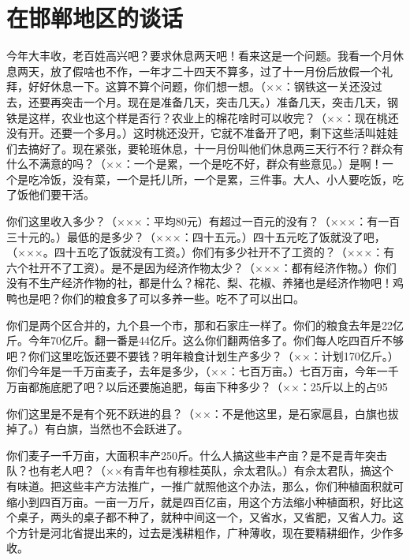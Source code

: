 \section[在邯郸地区的谈话（一九五八年十一月一日）]{在邯郸地区的谈话}


今年大丰收，老百姓高兴吧？要求休息两天吧！看来这是一个问题。我看一个月休息两天，放了假啥也不作，一年才二十四天不算多，过了十一月份后放假一个礼拜，好好休息一下。这算不算个问题，你们想一想。（××：钢铁这一关还没过去，还要再突击一个月。现在是准备几天，突击几天。）准备几天，突击几天，钢铁是这样，农业也这个样是否行？农业上的棉花啥时可以收完？（××：现在桃还没有开。还要一个多月。）这时桃还没开，它就不准备开了吧，剩下这些活叫娃娃们去搞好了。现在紧张，要轮班休息，十一月份叫他们休息两三天行不行？群众有什么不满意的吗？（××：一个是累，一个是吃不好，群众有些意见。）是啊！一个是吃冷饭，没有菜，一个是托儿所，一个是累，三件事。大人、小人要吃饭，吃了饭他们要干活。

你们这里收入多少？（×××：平均80元）有超过一百元的没有？（×××：有一百三十元的。）最低的是多少？（×××：四十五元。）四十五元吃了饭就没了吧，（×××。四十五吃了饭就没有工资。）你们有多少社开不了工资的？（×××：有六个社开不了工资）。是不是因为经济作物太少？（×××：都有经济作物。）你们没有不生产经济作物的社，都是什么？棉花、梨、花椒、养猪也是经济作物吧！鸡鸭也是吧？你们的粮食多了可以多养一些。吃不了可以出口。

你们是两个区合并的，九个县一个市，那和石家庄一样了。你们的粮食去年是22亿斤。今年70亿斤。翻一番是44亿斤。这么你们翻两倍多了。你们每人吃四百斤不够吧？你们这里吃饭还要不要钱？明年粮食计划生产多少？（××：计划170亿斤。）你们今年是一千万亩麦子，去年是多少，（××：七百万亩。）七百万亩，今年一千万亩都施底肥了吧？以后还要施追肥，每亩下种多少？（××：25斤以上的占95%

你们这里是不是有个死不跃进的县？（××：不是他这里，是石家扈县，白旗也拔掉了。）有白旗，当然也不会跃进了。

你们麦子一千万亩，大面积丰产250斤。什么人搞这些丰产亩？是不是青年突击队？也有老人吧？（××有青年也有穆桂英队，佘太君队。）有佘太君队，搞这个有味道。把这些丰产方法推广，一推广就照他这个办法，那么，你们种植面积就可缩小到四百万亩。一亩一万斤，就是四百亿亩，用这个方法缩小种植面积，好比这个桌子，两头的桌子都不种了，就种中间这一个，又省水，又省肥，又省人力。这个方针是河北省提出来的，过去是浅耕粗作，广种薄收，现在要精耕细作，少作多收。

